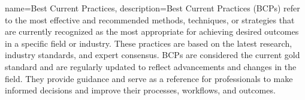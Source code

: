 
{
    name={Best Current Practices},
    description={Best Current Practices (BCPs) refer to the most effective and recommended methods, techniques, or strategies that are currently recognized as the most appropriate for achieving desired outcomes in a specific field or industry. These practices are based on the latest research, industry standards, and expert consensus. BCPs are considered the current gold standard and are regularly updated to reflect advancements and changes in the field. They provide guidance and serve as a reference for professionals to make informed decisions and improve their processes, workflows, and outcomes.}
}
